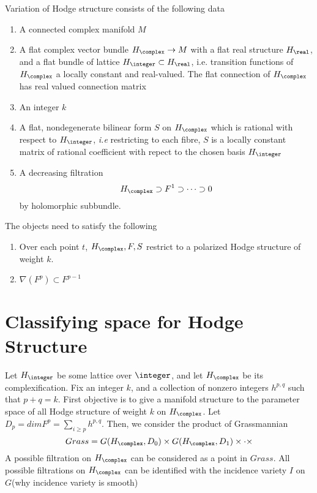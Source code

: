 \documentclass{article}
\begin{document}
Variation of Hodge structure consists of the following data
\begin{enumerate}
\item A connected complex manifold $M$
\item A flat complex vector bundle $H_{\complex} \rightarrow M$ with 
    a flat real structure $H_{\real}$, and a flat bundle of lattice
    $H_{\integer} \subset H_{\real}$, {i.e.} transition functions
    of $H_{\complex}$ a locally constant and real-valued. The flat connection
    of $H_{\complex}$ has real valued connection matrix

\item An integer $k$
\item A flat, nondegenerate bilinear form $S$ on $H_{\complex}$ which is rational
    with respect to $H_{\integer}$, \emph{i.e} restricting to each fibre, $S$
    is a locally constant matrix of rational coefficient with repect to the chosen
    basis $H_{\integer}$
\item A decreasing filtration
\[
    H_{\complex} \supset F^1\supset \cdots \supset 0
\]
by holomorphic subbundle.
\end{enumerate}
The objects need to satisfy the following
\begin{enumerate}
\item Over each point $t$, $H_{\complex}, F, S$ restrict to a polarized Hodge 
    structure of weight $k$.
\item $\nabla(F^p) \subset F^{p-1}$
\end{enumerate}

\newcommand{\HodgeNumber}{h^{p,q}}
\section{Classifying space for Hodge Structure}
Let $H_{\integer}$ be some lattice over $\integer$, and let $H_{\complex}$ 
be its complexification. Fix an integer $k$, and a collection of nonzero
integers $h^{p,q}$ such that $p + q = k$. First objective is to give a manifold
structure to the parameter space of all Hodge structure of weight $k$ on $H_{\complex}$.
Let $D_p = dim F^p = \sum\limits_{i\ge p} \HodgeNumber$. Then, we consider the product 
of Grassmannian
\[
    Grass = G(H_{\complex},D_0) \times G(H_{\complex}, D_1)\times\cdot \times 
\]
A possible filtration on $H_{\complex}$ can be considered as a point in $Grass$.
All possible filtrations on $H_{\complex}$ can be identified with the incidence
variety $I$ on $G$(why incidence variety is smooth)
\end{document}
